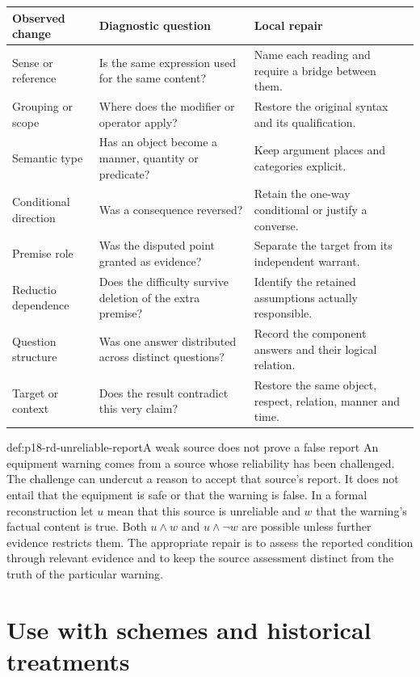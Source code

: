 \begin{center}
\begin{tabularx}{\textwidth}{@{}lXX@{}}
\toprule
Observed change & Diagnostic question & Local repair\\
\midrule
Sense or reference & Is the same expression used for the same content? &
Name each reading and require a bridge between them.\\
Grouping or scope & Where does the modifier or operator apply? &
Restore the original syntax and its qualification.\\
Semantic type & Has an object become a manner, quantity or predicate? &
Keep argument places and categories explicit.\\
Conditional direction & Was a consequence reversed? &
Retain the one-way conditional or justify a converse.\\
Premise role & Was the disputed point granted as evidence? &
Separate the target from its independent warrant.\\
Reductio dependence & Does the difficulty survive deletion of the extra premise? &
Identify the retained assumptions actually responsible.\\
Question structure & Was one answer distributed across distinct questions? &
Record the component answers and their logical relation.\\
Target or context & Does the result contradict this very claim? &
Restore the same object, respect, relation, manner and time.\\
\bottomrule
\end{tabularx}
\end{center}

\begin{hbexample}{def:p18-rd-unreliable-report}{A weak source does not prove a false report}
An equipment warning comes from a source whose reliability has been
challenged. The challenge can undercut a reason to accept that source's
report. It does not entail that the equipment is safe or that the warning
is false. In a formal reconstruction let \(u\) mean that this source
is unreliable and \(w\) that the warning's factual content is true.
Both \(u\land w\) and \(u\land\neg w\) are possible unless
further evidence restricts them. The appropriate repair is to assess
the reported condition through relevant evidence and to keep the source
assessment distinct from the truth of the particular warning.
\end{hbexample}

\section{Use with schemes and historical treatments}

